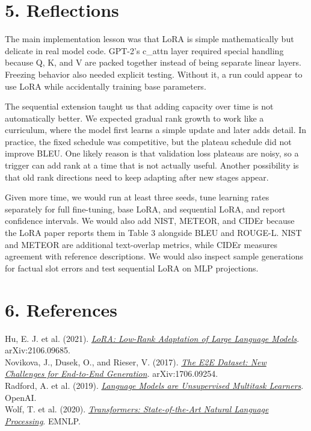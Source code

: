 \documentclass[11pt]{article}
\begin{document}
\section{5. Reflections}
The main implementation lesson was that LoRA is simple mathematically but delicate in real model code. GPT-2's c\_attn layer required special handling because Q, K, and V are packed together instead of being separate linear layers. Freezing behavior also needed explicit testing. Without it, a run could appear to use LoRA while accidentally training base parameters.

The sequential extension taught us that adding capacity over time is not automatically better. We expected gradual rank growth to work like a curriculum, where the model first learns a simple update and later adds detail. In practice, the fixed schedule was competitive, but the plateau schedule did not improve BLEU. One likely reason is that validation loss plateaus are noisy, so a trigger can add rank at a time that is not actually useful. Another possibility is that old rank directions need to keep adapting after new stages appear.

Given more time, we would run at least three seeds, tune learning rates separately for full fine-tuning, base LoRA, and sequential LoRA, and report confidence intervals. We would also add NIST, METEOR, and CIDEr because the LoRA paper reports them in Table 3 alongside BLEU and ROUGE-L. NIST and METEOR are additional text-overlap metrics, while CIDEr measures agreement with reference descriptions. We would also inspect sample generations for factual slot errors and test sequential LoRA on MLP projections.

\section{6. References}
\footnotesize
Hu, E. J. et al. (2021). \href{https://arxiv.org/abs/2106.09685}{\textit{LoRA: Low-Rank Adaptation of Large Language Models}}. arXiv:2106.09685.\\
Novikova, J., Dusek, O., and Rieser, V. (2017). \href{https://arxiv.org/abs/1706.09254}{\textit{The E2E Dataset: New Challenges for End-to-End Generation}}. arXiv:1706.09254.\\
Radford, A. et al. (2019). \href{https://cdn.openai.com/better-language-models/language-models.pdf}{\textit{Language Models are Unsupervised Multitask Learners}}. OpenAI.\\
Wolf, T. et al. (2020). \href{https://aclanthology.org/2020.emnlp-demos.6/}{\textit{Transformers: State-of-the-Art Natural Language Processing}}. EMNLP.
\end{document}
